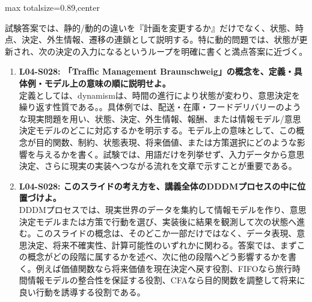 \begin{minipage}[t]{0.58\textwidth}
\begin{adjustbox}{max totalsize={\textwidth}{0.89\textheight},center}
\begin{minipage}{\textwidth}
試験答案では、静的/動的の違いを『計画を変更するか』だけでなく、状態、時点、決定、外生情報、遷移の連鎖として説明する。特に動的問題では、状態が更新され、次の決定の入力になるというループを明確に書くと満点答案に近づく。\par{}\begin{enumerate}\item \textbf{L04-S028: 「Traffic Management Braunschweig」の概念を、定義・具体例・モデル上の意味の順に説明せよ。}\\定義としては、dynamismは、時間の進行により状態が変わり、意思決定を繰り返す性質である。。具体例では、配送・在庫・フードデリバリーのような現実問題を用い、状態、決定、外生情報、報酬、または情報モデル/意思決定モデルのどこに対応するかを明示する。モデル上の意味として、この概念が目的関数、制約、状態表現、将来価値、または方策選択にどのような影響を与えるかを書く。試験では、用語だけを列挙せず、入力データから意思決定、さらに現実の実装へつながる流れを文章で示すことが重要である。\item \textbf{L04-S028: このスライドの考え方を、講義全体のDDDMプロセスの中に位置づけよ。}\\DDDMプロセスでは、現実世界のデータを集約して情報モデルを作り、意思決定モデルまたは方策で行動を選び、実装後に結果を観測して次の状態へ進む。このスライドの概念は、そのどこか一部だけではなく、データ表現、意思決定、将来不確実性、計算可能性のいずれかに関わる。答案では、まずこの概念がどの段階に属するかを述べ、次に他の段階へどう影響するかを書く。例えば価値関数なら将来価値を現在決定へ戻す役割、FIFOなら旅行時間情報モデルの整合性を保証する役割、CFAなら目的関数を調整して将来に良い行動を誘導する役割である。\end{enumerate}
\end{minipage}
\end{adjustbox}
\end{minipage}


